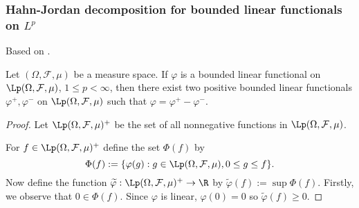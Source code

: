 \subsubsection{Hahn-Jordan decomposition for bounded linear functionals on $L^p$}
Based on \cite{bartle_measure_integration}.

\begin{theorem}
Let $(\Omega, \mathcal{F}, \mu)$ be a measure space. If $\varphi$ is a bounded linear functional on $\Lp(\Omega, \mathcal{F}, \mu)$, $1 \leq p < \infty$, then there exist two positive bounded linear functionals $\varphi^+, \varphi^-$  on $\Lp(\Omega, \mathcal{F}, \mu)$ such that $\varphi = \varphi^+ - \varphi^-$.
\end{theorem}
\begin{proof}
Let $\Lp(\Omega, \mathcal{F}, \mu)^+$ be the set of all nonnegative functions in $\Lp(\Omega, \mathcal{F}, \mu)$.

For $f \in \Lp(\Omega, \mathcal{F}, \mu)^+$ define the set $\Phi(f)$ by
\begin{equation*}
    \Phi(f) := \{ \varphi(g) : g \in \Lp(\Omega, \mathcal{F}, \mu), 0 \leq g \leq f \}.
\end{equation*}
Now define the function $\widetilde{\varphi} : \Lp(\Omega, \mathcal{F}, \mu)^+ \to \R$ by $\widetilde{\varphi}(f) := \sup \Phi(f)$.
Firstly, we observe that $0 \in \Phi(f)$. Since $\varphi$ is linear, $\varphi(0) = 0$ so $\widetilde{\varphi}(f) \geq 0$.


\end{proof}
